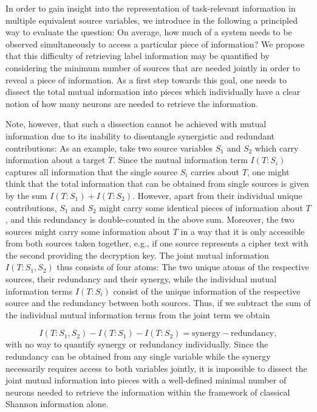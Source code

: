 \documentclass[10pt]{article}
\theoremstyle{definition}
\theoremstyle{plain}
\begin{document}
In order to gain insight into the representation of task-relevant information in multiple equivalent source variables, we introduce in the following a principled way to evaluate the question: On average, how much of a system needs to be observed simultaneously to access a particular piece of information? We propose that this difficulty of retrieving label information may be quantified by considering the minimum number of sources that are needed jointly in order to reveal a piece of information. As a first step towards this goal, one needs to dissect the total mutual information into pieces which individually have a clear notion of how many neurons are needed to retrieve the information.

Note, however, that such a dissection cannot be achieved with mutual information due to its inability to disentangle synergistic and redundant contributions: As an example, take two source variables $S_1$ and $S_2$ which carry information about a target $T$. Since the mutual information term $I(T:S_i)$ captures all information that the single source $S_i$ carries about $T$, one might think that the total information that can be obtained from single sources is given by the sum $I(T:S_1) + I(T:S_2)$. However, apart from their individual unique contributions, $S_1$ and $S_2$ might carry some identical pieces of information about $T$, and this redundancy is double-counted in the above sum. Moreover, the two sources might carry some information about $T$ in a way that it is only accessible from both sources taken together, e.g., if one source represents a cipher text with the second providing the decryption key. The joint mutual information $I(T:S_1, S_2)$ thus consists of four atoms: The two unique atoms of the respective sources, their redundancy and their synergy, while the individual mutual information terms $I(T:S_i)$ consist of the unique information of the respective source and the redundancy between both sources. Thus, if we subtract the sum of the individual mutual information terms from the joint term we obtain

\begin{equation*}
    I(T:S_1, S_2) - I(T:S_1) - I(T:S_2) = \mathrm{synergy} - \mathrm{redundancy},
\end{equation*}
with no way to quantify synergy or redundancy individually. Since the redundancy can be obtained from any single variable while the synergy necessarily requires access to both variables jointly, it is impossible to dissect the joint mutual information into pieces with a well-defined minimal number of neurons needed to retrieve the information within the framework of classical Shannon information alone.
\end{document}
